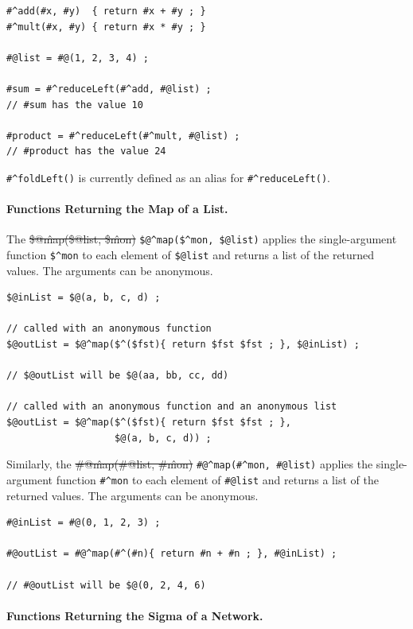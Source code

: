 \documentclass[letterpaper,12pt]{article}
\begin{document}
\begin{Verbatim}[fontsize=\small]
#^add(#x, #y)  { return #x + #y ; }
#^mult(#x, #y) { return #x * #y ; }

#@list = #@(1, 2, 3, 4) ;

#sum = #^reduceLeft(#^add, #@list) ;
// #sum has the value 10

#product = #^reduceLeft(#^mult, #@list) ;
// #product has the value 24
\end{Verbatim}

\noindent
\verb!#^foldLeft()! 
is currently defined as an alias for \verb!#^reduceLeft()!.

\paragraph{Functions Returning the Map of a List.}

The \sout{\$@\^map(\$@list, \$\^mon)} \verb!$@^map($^mon, $@list)!
applies the single-argument function \verb!$^mon! to each element of
\verb!$@list! and returns a list of the returned values.  The arguments
can be anonymous.

\begin{Verbatim}[fontsize=\small]
$@inList = $@(a, b, c, d) ;

// called with an anonymous function
$@outList = $@^map($^($fst){ return $fst $fst ; }, $@inList) ;

// $@outList will be $@(aa, bb, cc, dd)

// called with an anonymous function and an anonymous list
$@outList = $@^map($^($fst){ return $fst $fst ; }, 
                   $@(a, b, c, d)) ;
\end{Verbatim}

Similarly, the \sout{\#@\^map(\#@list, \#\^mon)} 
\verb!#@^map(#^mon, #@list)!  applies the single-argument 
function \verb!#^mon! to each
element of \verb!#@list! and returns a list of the returned values.  The
arguments can be anonymous.

\begin{Verbatim}[fontsize=\small]
#@inList = #@(0, 1, 2, 3) ;

#@outList = #@^map(#^(#n){ return #n + #n ; }, #@inList) ;

// #@outList will be $@(0, 2, 4, 6)
\end{Verbatim}

\paragraph{Functions Returning the Sigma of a Network.}
\end{document}
